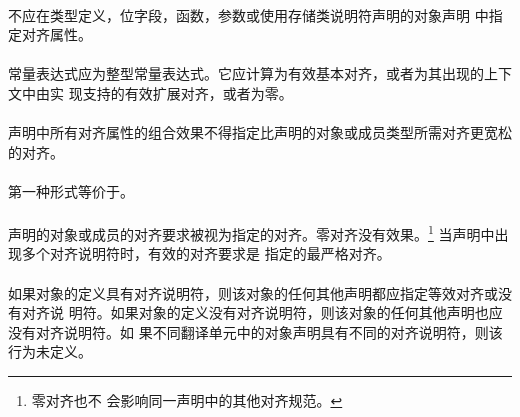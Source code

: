 {\constraint
\paragraph{}
不应在类型定义，位字段，函数，参数或使用存储类说明符声明的对象声明
中指定对齐属性。

\paragraph{}
常量表达式应为整型常量表达式。它应计算为有效基本对齐，或者为其出现的上下文中由实
现支持的有效扩展对齐，或者为零。

\paragraph{}
声明中所有对齐属性的组合效果不得指定比声明的对象或成员类型所需对齐更宽松的对齐。

\semantic
\paragraph{}
第一种形式等价于\tm{))}。

\paragraph{}
声明的对象或成员的对齐要求被视为指定的对齐。零对齐没有效果。\footnote{零对齐也不
会影响同一声明中的其他对齐规范。} 当声明中出现多个对齐说明符时，有效的对齐要求是
指定的最严格对齐。

\paragraph{}
如果对象的定义具有对齐说明符，则该对象的任何其他声明都应指定等效对齐或没有对齐说
明符。如果对象的定义没有对齐说明符，则该对象的任何其他声明也应没有对齐说明符。如
果不同翻译单元中的对象声明具有不同的对齐说明符，则该行为未定义。

\syntax
}
